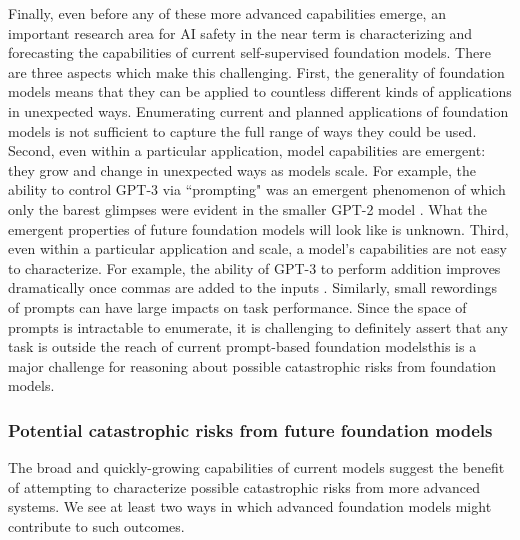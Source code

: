 Finally, even before any of these more advanced capabilities emerge, an important research area for AI safety in the near term is characterizing and forecasting the capabilities of current self-supervised foundation models. There are three aspects which make this challenging. First, the generality of foundation models means that they can be applied to countless different kinds of applications in unexpected ways. Enumerating current and planned applications of foundation models is not sufficient to capture the full range of ways they could be used. Second, even within a particular application, model capabilities are emergent: they grow and change in unexpected ways as models scale. For example, the ability to control GPT-3 via ``prompting" was an emergent phenomenon of which only the barest glimpses were evident in the smaller GPT-2 model \citep{radford2019language,brown2020gpt3}. What the emergent properties of future foundation models will look like is unknown. Third, even within a particular application and scale, a model's capabilities are not easy to characterize. For example, the ability of GPT-3 to perform addition improves dramatically once commas are added to the inputs \citep{branwen2020gpt, brockman2020math}. Similarly, small rewordings of prompts can have large impacts on task performance. Since the space of prompts is intractable to enumerate, it is challenging to definitely assert that any task is outside the reach of current prompt-based foundation models\dash{}this is a major challenge for reasoning about possible catastrophic risks from foundation models.


\subsubsection{Potential catastrophic risks from future foundation models}
The broad and quickly-growing capabilities of current models suggest the benefit of attempting to characterize possible catastrophic risks from more advanced systems. We see at least two ways in which advanced foundation models might contribute to such outcomes. 

